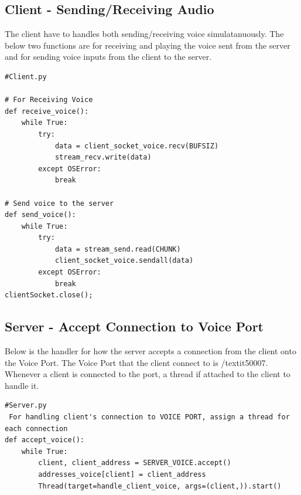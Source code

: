 \documentclass[a4paper,11pt]{article}
\begin{document}
\subsection{Client - Sending/Receiving  Audio}
The client have to handles both sending/receiving voice simulatanuously. The below two functions are for receiving and playing the voice sent from the server and for sending voice inputs from the client to the server.
\begin{mdframed}[backgroundcolor=light-gray, roundcorner=30pt,leftmargin=1, rightmargin=1, innerleftmargin=5, innertopmargin=-3,innerbottommargin=5, outerlinewidth=1, linecolor=light-gray]
\begin{lstlisting}
#Client.py

# For Receiving Voice
def receive_voice():
	while True:
		try:
			data = client_socket_voice.recv(BUFSIZ)
			stream_recv.write(data)
		except OSError:
			break

# Send voice to the server
def send_voice():
	while True:
		try:
			data = stream_send.read(CHUNK)
			client_socket_voice.sendall(data)
		except OSError:
			break
clientSocket.close();
\end{lstlisting}
\end{mdframed}

\subsection{Server - Accept Connection to Voice Port}
Below is the handler for how the server accepts a connection from the client onto the Voice Port. The Voice Port that the client connect to is /textit{50007}. Whenever a client is connected to the port, a thread if attached to the client to handle it.

\begin{mdframed}[backgroundcolor=light-gray, roundcorner=30pt,leftmargin=1, rightmargin=1, innerleftmargin=5, innertopmargin=-3,innerbottommargin=5, outerlinewidth=1, linecolor=light-gray]
\begin{lstlisting}
#Server.py
 For handling client's connection to VOICE PORT, assign a thread for each connection
def accept_voice():
	while True:
		client, client_address = SERVER_VOICE.accept()
		addresses_voice[client] = client_address
		Thread(target=handle_client_voice, args=(client,)).start()
\end{lstlisting}
\end{mdframed}
\end{document}
